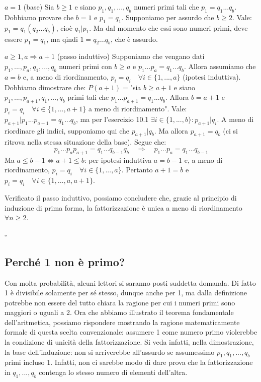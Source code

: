 \documentclass[oneside]{book}
\theoremstyle{remark}
\newcommand{\cvd}{\begin{flushright}$\square$\end{flushright}} %
\begin{document}
\begin{tcolorbox}[enhanced, breakable, title={Teorema Fondamentale dell'Aritmetica}]
$a=1$ (base) Sia $b \geq 1$ e siano $p_1,q_1,...,q_b$ numeri primi tali che
$p_1 = q_1...q_b$. Dobbiamo provare che $b=1$ e $p_1 = q_1$. Supponiamo per
assurdo che $b \geq 2$. Vale: $p_1 = q_1(q_2...q_b)$, cioè $q_1|p_1$. Ma dal
momento che essi sono numeri primi, deve essere $p_1 = q_1$,
ma qindi $1 = q_2...q_b$, che è assurdo.

$a \geq 1, a \Rightarrow a+1$ (passo induttivo) Supponiamo che vengano dati $p_1,...,p_a,
q_1,...,q_b$ numeri primi con $b \geq a$ e $p_1...p_a = q_1...q_b$. Allora
assumiamo che $a=b$ e, a meno di riordinamento, $p_i = q_i \quad \forall i \in \{1,...,a\}$
(ipotesi induttiva). Dobbiamo dimostrare che: $P(a+1)= $"sia $b \geq a+1$ e siano
$p_1,...,p_{a+1},q_1,...,q_b$ primi tali che $p_1...p_{a+1} = q_1...q_b$.
Allora $b = a+1$ e $p_i = q_i \quad \forall i \in \{1,...,a+1\}$
a meno di riordinamento". Vale: $p_{a+1}|p_1...p_{a+1} = q_1...q_b$, ma per
l'esercizio 10.1 $\exists i \in \{1,...,b\}: p_{a+1}|q_i$. A meno di riordinare
gli indici, supponiamo qui che $p_{a+1}|q_b$. Ma allora $p_{a+1} = q_b$ (ci si
ritrova nella stessa situazione della base). Segue che:
\[ p_1...p_ap_{a+1} = q_1...q_{b-1}q_b \quad \Rightarrow \quad  p_1...p_a = q_1...q_{b-1} \]
Ma $a \leq b-1 \Leftrightarrow a+1 \leq b$: per ipotesi induttiva $a = b-1$ e,
a meno di riordinamento, $p_i = q_i \quad \forall i \in \{1,...,a\}$. Pertanto
$a+1 = b$ e $p_i = q_i \quad \forall i \in \{1,...,a,a+1\}$.

Verificato il passo induttivo, possiamo concludere che, grazie al principio di
induzione di prima forma, la fattorizzazione è unica a meno di riordinamento
$\forall n \geq 2$.
\cvd
\end{tcolorbox}

\subsection*{Perché 1 non è primo?}
Con molta probabilità, alcuni lettori si saranno posti suddetta domanda. Di fatto
1 è divisibile solamente per sé stesso, dunque anche per 1, ma dalla definizione
potrebbe non essere del tutto chiara la ragione per cui i numeri primi
sono maggiori o uguali a 2. Ora che abbiamo illustrato il teorema fondamentale
dell'aritmetica, possiamo rispondere mostrando la ragione matematicamente
formale di questa scelta convenzionale: assumere 1 come numero primo violerebbe
la condizione di unicità della fattorizzazione. Si veda infatti, nella dimostrazione,
la base dell'induzione: non si arriverebbe
all'assurdo se assumessimo $p_1,q_1,...,q_b$ primi incluso 1. Infatti, non ci
sarebbe modo di dare prova che la fattorizzazione in $q_1,...,q_b$ contenga lo
stesso numero di elementi dell'altra.
\end{document}
